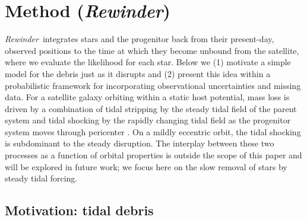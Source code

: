 \documentclass[letterpaper,12pt,preprint]{aastex}
\newcommand{\rewinder}{\emph{Rewinder}}
\begin{document}
\section{Method (\rewinder)}\label{sec:method}

\rewinder\ integrates stars and the progenitor back from their present-day, observed positions to the time at which they become unbound from the satellite, where we evaluate the likelihood for each star. Below we (1) motivate a simple model for the debris just as it disrupts and (2) present this idea within a probabilistic framework for incorporating observational uncertainties and missing data. For a satellite galaxy orbiting within a static host potential, mass loss is driven by a combination of tidal stripping by the steady tidal field of the parent system and tidal shocking by the rapidly changing tidal field as the progenitor system moves through pericenter \citep[e.g.,][]{choi09}. On a mildly eccentric orbit, the tidal shocking is subdominant to the steady disruption. The interplay between these two processes as a function of orbital properties is outside the scope of this paper and will be explored in future work; we focus here on the slow removal of stars by steady tidal forcing. 

\subsection{Motivation: tidal debris}\label{sec:debris}
\end{document}
